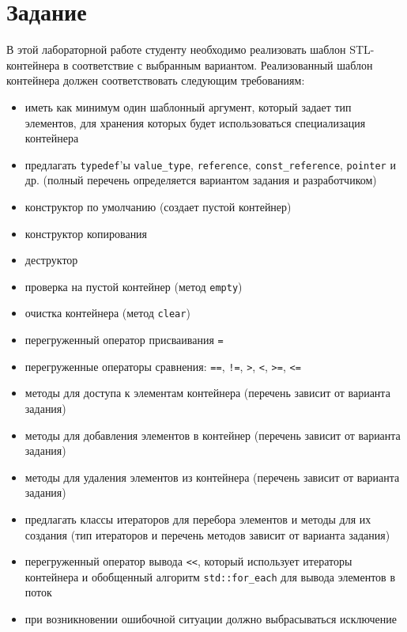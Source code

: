 \documentclass[a4paper,12pt]{article}
\begin{document}



\tableofcontents

\section{Задание}
\label{sec:Task}

В этой лабораторной работе студенту необходимо реализовать шаблон
STL-контейнера в соответствие с выбранным вариантом. Реализованный
шаблон контейнера должен соответствовать следующим требованиям:

\begin{itemize}
\item иметь как минимум один шаблонный аргумент, который задает тип
  элементов, для хранения которых будет использоваться специализация
  контейнера
\item предлагать \lstinline|typedef|’ы \lstinline|value_type|,
  \lstinline|reference|, \lstinline|const_reference|,
  \lstinline|pointer| и др. (полный перечень определяется вариантом
  задания и разработчиком)
\item конструктор по умолчанию (создает пустой контейнер)
\item конструктор копирования
\item деструктор
\item проверка на пустой контейнер (метод \lstinline|empty|)
\item очистка контейнера (метод \lstinline|clear|)
\item перегруженный оператор присваивания \lstinline|=|
\item перегруженные операторы сравнения: \lstinline|==|,
  \lstinline|!=|, \lstinline|>|, \lstinline|<|, \lstinline|>=|,
  \lstinline|<=|
\item методы для доступа к элементам контейнера (перечень зависит от
  варианта задания)
\item методы для добавления элементов в контейнер (перечень зависит от
  варианта задания)
\item методы для удаления элементов из контейнера (перечень зависит от
  варианта задания)
\item предлагать классы итераторов для перебора элементов и методы для
  их создания (тип итераторов и перечень методов зависит от варианта
  задания)
\item перегруженный оператор вывода \lstinline|<<|, который использует
  итераторы контейнера и обобщенный алгоритм \lstinline|std::for_each|
  для вывода элементов в поток
\item при возникновении ошибочной ситуации должно выбрасываться
  исключение
\end{itemize}
\end{document}
